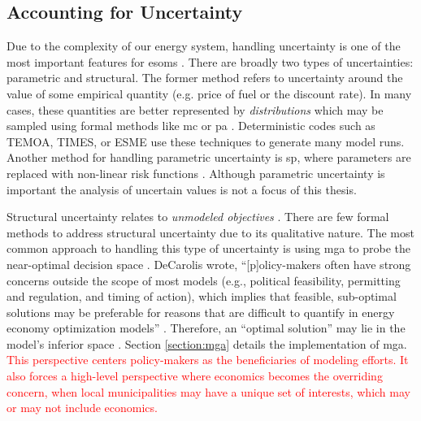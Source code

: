 \subsection{Accounting for Uncertainty}
Due to the complexity of our energy system, handling uncertainty is one of the
most important features for \acp{esom} \cite{yue_review_2018,
decarolis_using_2011}. There are broadly two types of uncertainties: parametric
and structural. The former method refers to uncertainty around the value of some
empirical quantity (e.g. price of fuel or the discount rate). In many cases,
these quantities are better represented by \textit{distributions} which may be
sampled using formal methods like \ac{mc} or \ac{pa}
\cite{pfenninger_energy_2014, yue_review_2018}. Deterministic codes such as
TEMOA, TIMES, or ESME use these techniques to generate many model runs. Another
method for handling parametric uncertainty is \ac{sp}, where parameters are
replaced with non-linear risk functions \cite{yue_review_2018,
decarolis_multi-stage_2012}. Although parametric uncertainty is important the
analysis of uncertain values is not a focus of this thesis.

Structural uncertainty relates to \textit{unmodeled objectives}
\cite{yue_review_2018, decarolis_using_2011, decarolis_modelling_2016}. There
are few formal methods to address structural uncertainty due to its qualitative
nature. The most common approach to handling this type of uncertainty is using
\ac{mga} to probe the near-optimal decision space \cite{brill_mga_1990,
jenkins_genx_2022, decarolis_using_2011, neumann_near-optimal_2021,
pfenninger_energy_2014}. DeCarolis wrote, ``[p]olicy-makers often have strong
concerns outside the scope of most models (e.g., political feasibility,
permitting and regulation, and timing of action), which implies that feasible,
sub-optimal solutions may be preferable for reasons that are difficult to
quantify in energy economy optimization models'' \cite{decarolis_using_2011}.
Therefore, an ``optimal solution'' may lie in the model's inferior space
\cite{decarolis_using_2011}. Section \ref{section:mga} details the
implementation of \ac{mga}. \textcolor{red}{This perspective centers
policy-makers as the beneficiaries of modeling efforts. It also forces a
high-level perspective where economics becomes the overriding concern, when
local municipalities may have a unique set of interests, which may or may not
include economics.}

